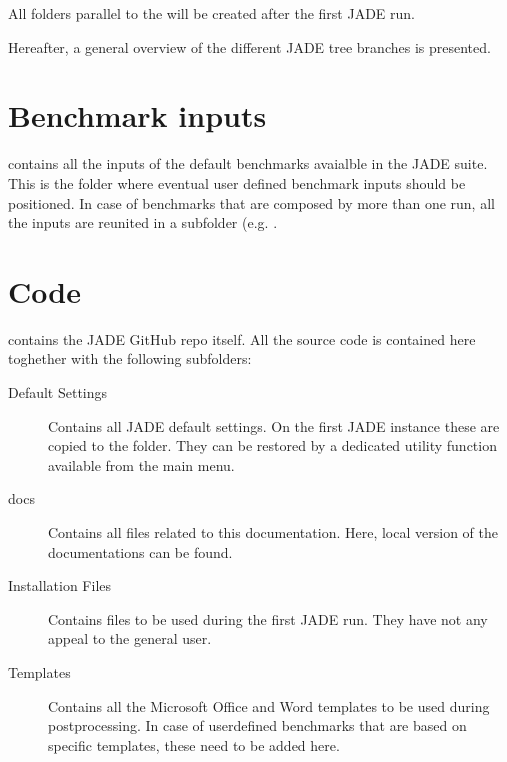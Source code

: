 \documentclass[letterpaper,10pt,english]{sphinxmanual}
\begin{document}
All folders parallel to the  will be created after the first JADE run.

Hereafter, a general overview of the different JADE tree branches is presented.


\section{Benchmark inputs}
\label{\detokenize{usage/folders:benchmark-inputs}}
 contains all the inputs of the default benchmarks avaialble in the JADE suite.
This is the folder where eventual user defined benchmark inputs should be positioned.
In case of benchmarks that are composed by more than one run, all the inputs are reunited in a sub\sphinxhyphen{}folder
(e.g. .


\section{Code}
\label{\detokenize{usage/folders:code}}
 contains the JADE GitHub repo itself. All the source code is contained here toghether with the
following subfolders:
\begin{description}
\item[{Default Settings}] \leavevmode
Contains all JADE default settings. On the first JADE instance these are copied to the 
folder. They can be restored by a dedicated utility function available from the main menu.

\item[{docs}] \leavevmode
Contains all files related to this documentation. Here, local version of the documentations can be found.

\item[{Installation Files}] \leavevmode
Contains files to be used during the first JADE run. They have not any appeal to the general user.

\item[{Templates}] \leavevmode
Contains all the Microsoft Office and Word templates to be used during post\sphinxhyphen{}processing. In case of user\sphinxhyphen{}defined
benchmarks that are based on specific templates, these need to be added here.

\end{description}
\end{document}
